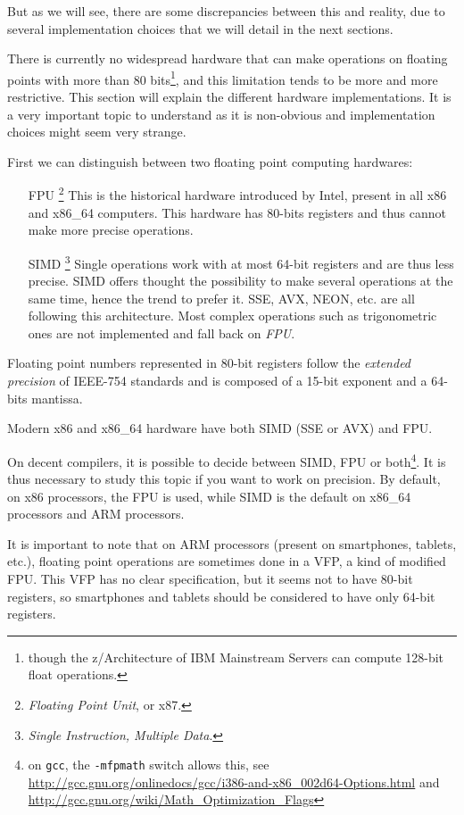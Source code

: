 But as we will see, there are some discrepancies between this and reality, due to several implementation choices that we will detail in the next sections.


There is currently no widespread hardware that can make operations on floating points with more than 80 bits\footnote{though the z/Architecture of IBM Mainstream Servers can compute 128-bit float operations.}, and this limitation tends to be more and more restrictive. This section will explain the different hardware implementations. It is a very important topic to understand as it is non-obvious and implementation choices might seem very strange.

First we can distinguish between two floating point computing hardwares:
\begin{enumerate}
\item[FPU]\footnote{\emph{Floating Point Unit}, or x87.} This is the historical hardware introduced by Intel, present in all x86 and x86\_64 computers. This hardware has 80-bits registers and thus cannot make more precise operations.
\item[SIMD]\footnote{\emph{Single Instruction, Multiple Data}.} Single operations work with at most 64-bit registers and are thus less precise. SIMD offers thought the possibility to make several operations at the same time, hence the trend to prefer it. SSE, AVX, NEON, etc. are all following this architecture. Most complex operations such as trigonometric ones are not implemented and fall back on \emph{FPU}.
\end{enumerate}

Floating point numbers represented in 80-bit registers follow the \emph{extended precision} of IEEE-754 standards and is composed of a 15-bit exponent and a 64-bits mantissa.

Modern x86 and x86\_64 hardware have both SIMD (SSE or AVX) and FPU.

On decent compilers, it is possible to decide between SIMD, FPU or both\footnote{on \texttt{gcc}, the \texttt{-mfpmath} switch allows this, see \url{http://gcc.gnu.org/onlinedocs/gcc/i386-and-x86_002d64-Options.html} and \url{http://gcc.gnu.org/wiki/Math_Optimization_Flags}}. It is thus necessary to study this topic if you want to work on precision. By default, on x86 processors, the FPU is used, while SIMD is the default on x86\_64 processors and ARM processors.

It is important to note that on ARM processors (present on smartphones, tablets, etc.), floating point operations are sometimes done in a VFP, a kind of modified FPU. This VFP has no clear specification, but it seems not to have 80-bit registers, so smartphones and tablets should be considered to have only 64-bit registers.


